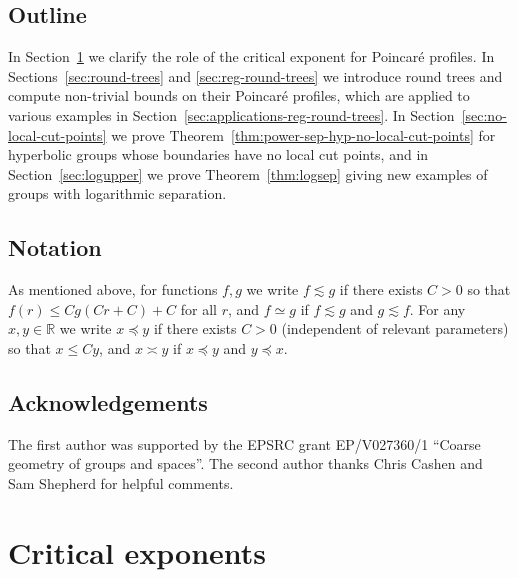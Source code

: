 \documentclass[11pt]{amsart}
\numberwithin{equation}{section}
\theoremstyle{citing}
\newcommand{\R}{\mathbb{R}}
\numberwithin{equation}{section}
\begin{document}
\subsection{Outline}
In Section~\ref{sec:crit-exp} we clarify the role of the critical exponent for Poincar\'e profiles.  In Sections~\ref{sec:round-trees} and \ref{sec:reg-round-trees} we introduce round trees and compute non-trivial bounds on their Poincar\'e profiles, which are applied to various examples in Section~\ref{sec:applications-reg-round-trees}.  In Section~\ref{sec:no-local-cut-points} we prove Theorem~\ref{thm:power-sep-hyp-no-local-cut-points} for hyperbolic groups whose boundaries have no local cut points, and in Section~\ref{sec:logupper} we prove Theorem~\ref{thm:logsep} giving new examples of groups with logarithmic separation.


\subsection{Notation}
As mentioned above, for functions $f, g$ we write $f \lesssim g$ if there exists $C>0$ so that $f(r) \leq Cg(Cr+C)+C$ for all $r$, and $f \simeq g$ if $f \lesssim g$ and $g \lesssim f$.
For any $x,y \in \R$ we write $x \preceq y$ if there exists $C>0$ (independent of relevant parameters) so that $x \leq Cy$, and $x \asymp y$ if $x \preceq y$ and $y\preceq x$.

\subsection*{Acknowledgements}
The first author was supported by the EPSRC grant EP/V027360/1 ``Coarse geometry of groups and spaces''. The second author thanks Chris Cashen and Sam Shepherd for helpful comments.

\section{Critical exponents}
\label{sec:crit-exp}
\end{document}
